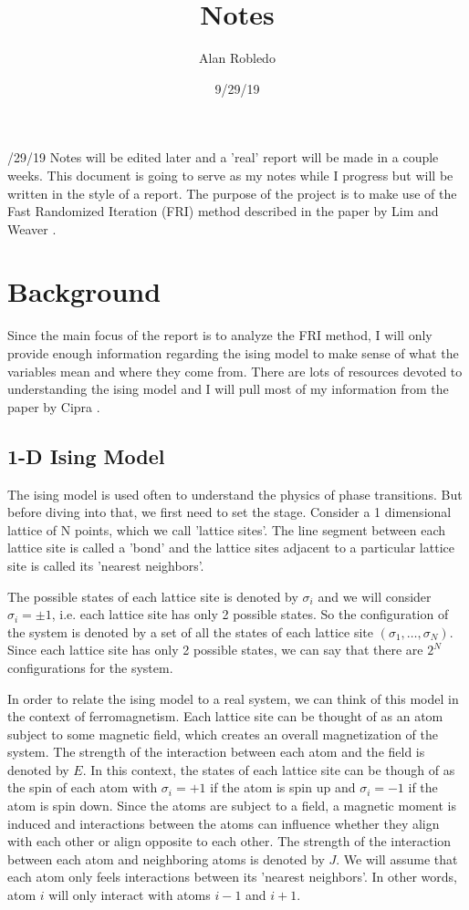 \documentclass{article}
\title{Notes}
\date{9/29/19}
\author{Alan Robledo}
\begin{document}
/29/19 Notes will be edited later and a 'real' report will be made in a couple weeks.
This document is going to serve as my notes while I progress but will be written in the style of a report.
The purpose of the project is to make use of the Fast Randomized Iteration (FRI) method described in the paper by Lim and Weaver \cite{lim_weare}.
\section{Background}
Since the main focus of the report is to analyze the FRI method, I will only provide enough information regarding the ising model to make sense of what the variables mean and where they come from. There are lots of resources devoted to understanding the ising model and I will pull most of my information from the paper by Cipra \cite{cipra}.

\subsection{1-D Ising Model}
The ising model is used often to understand the physics of phase transitions.
But before diving into that, we first need to set the stage.
Consider a 1 dimensional lattice of N points, which we call 'lattice sites'.
The line segment between each lattice site is called a 'bond' and the lattice sites adjacent to a particular lattice site is called its 'nearest neighbors'.

The possible states of each lattice site is denoted by $\sigma_i$ and we will consider $\sigma_i = \pm 1$, i.e. each lattice site has only 2 possible states.
So the configuration of the system is denoted by a set of all the states of each lattice site $(\sigma_1, \dots, \sigma_N)$.
Since each lattice site has only 2 possible states, we can say that there are $2^N$ configurations for the system.

In order to relate the ising model to a real system, we can think of this model in the context of ferromagnetism.
Each lattice site can be thought of as an atom subject to some magnetic field, which creates an overall magnetization of the system.
The strength of the interaction between each atom and the field is denoted by $E$.
In this context, the states of each lattice site can be though of as the spin of each atom with $\sigma_i = +1$ if the atom is spin up and $\sigma_i = -1$ if the atom is spin down.
Since the atoms are subject to a field, a magnetic moment is induced and interactions between the atoms can influence whether they align with each other or align opposite to each other.
The strength of the interaction between each atom and neighboring atoms is denoted by $J$.
We will assume that each atom only feels interactions between its 'nearest neighbors'.
In other words, atom $i$ will only interact with atoms $i - 1$ and $i + 1$.
\end{document}
